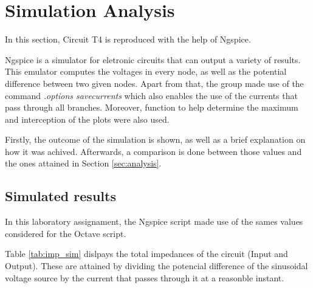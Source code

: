 
\section{Simulation Analysis}
\label{sec:simulation}



In this section, Circuit T4 is reproduced with the help of Ngspice.

Ngspice is a simulator for eletronic circuits that can output a variety of results.
This emulator computes the voltages in every node, as well as the potential difference
between two given nodes. Apart from that, the group made use of the command
{\em .options savecurrents} which also enables the use of the currents that pass
through all branches. Moreover, function to help determine the maximum and interception
of the plots were also used.

Firstly, the outcome of the simulation is shown, as well as a brief explanation
on how it was achived. Afterwards, a comparison is done between those values and
the ones attained in Section \ref{sec:analysis}.




\subsection{Simulated results}
\label{subsec:sim_res}

In this laboratory assignament, the Ngspice script made use of the sames values considered for the Octave script.

Table \ref{tab:imp_sim} dislpays the total impedances of the circuit (Input and Output). These are attained by dividing the potencial difference of the sinusoidal voltage source by the current that passes through it at a reasonble instant.

